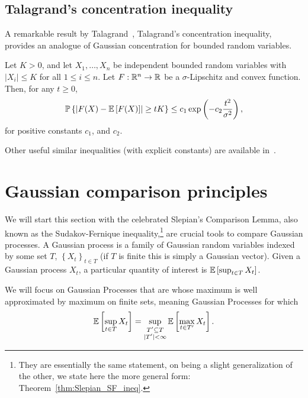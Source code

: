 \subsection{Talagrand's concentration inequality}

A remarkable result by Talagrand~\cite{Talagrand_concentration_1995}, Talagrand's concentration inequality, provides an analogue of Gaussian concentration for bounded random variables.

\begin{theorem}
Let $K>0$, and let $X_1,\dots,X_n$ be independent bounded random variables with $|X_i|\leq K$ for all $1\leq i \leq n$. Let $F:\mathbb{R}^n \to \mathbb{R}$ be a $\sigma$-Lipschitz and convex function. Then, for any $t\geq 0$,
\[
 {\mathbb{P}}\left\{ \left|F(X) - \mathbb{E}\left[F(X)\right] \right| \geq t K\right\} \leq c_1 \exp\left( -c_2 \frac{t^2}{\sigma^2} \right), 
\]
for positive constants $c_1$, and $c_2$.
\end{theorem}

Other useful similar inequalities (with explicit constants) are available in~\cite{Massart_constants}.






 




\section{Gaussian comparison principles}\label{sec:gaussiancomparisonineqs}

We will start this section with the celebrated Slepian's Comparison Lemma, also known as the Sudakov-Fernique inequality,\footnote{They are essentially the same statement, on being a slight generalization of the other, we state here the more general form: Theorem~\ref{thm:Slepian_SF_ineq}.} are crucial tools to compare Gaussian processes. A Gaussian process is a family of Gaussian random variables indexed by some set $T$, $\left\{X_t\right\}_{t\in T}$ (if $T$ is finite this is simply a Gaussian vector). Given a Gaussian process $X_t$, a particular quantity of interest is $\mathbb{E}\left[\sup_{t\in T}X_t\right]$.

We will focus on Gaussian Processes that are whose maximum is well approximated by maximum on finite sets, meaning Gaussian Processes for which
    \begin{equation}\label{eq:separablegaussianprocess}
    \mathbb{E}\left[\sup_{t\in T}X_t\right] = \sup_{\substack{T' \subseteq T \\ |T'| < \infty}} \mathbb{E}\left[\max_{t\in T'}X_t\right].
    \end{equation}


